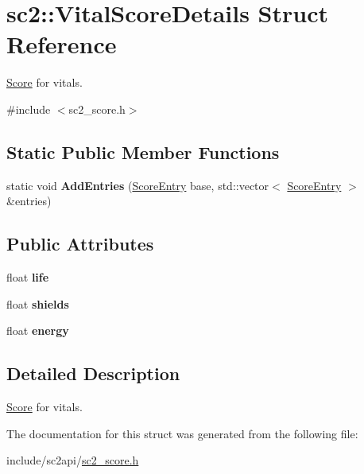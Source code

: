 \hypertarget{structsc2_1_1_vital_score_details}{}\section{sc2\+:\+:Vital\+Score\+Details Struct Reference}
\label{structsc2_1_1_vital_score_details}


\hyperlink{structsc2_1_1_score}{Score} for vitals.  




{\ttfamily \#include $<$sc2\+\_\+score.\+h$>$}

\subsection*{Static Public Member Functions}
\begin{DoxyCompactItemize}
\item 
\mbox{\label{structsc2_1_1_vital_score_details_adfe7fda209f61db978d18a5a70d4b75b}} 
static void {\bfseries Add\+Entries} (\hyperlink{structsc2_1_1_score_entry}{Score\+Entry} base, std\+::vector$<$ \hyperlink{structsc2_1_1_score_entry}{Score\+Entry} $>$ \&entries)
\end{DoxyCompactItemize}
\subsection*{Public Attributes}
\begin{DoxyCompactItemize}
\item 
\mbox{\label{structsc2_1_1_vital_score_details_a9e2038167b6e5297c9f50da7cfd4192c}} 
float {\bfseries life}
\item 
\mbox{\label{structsc2_1_1_vital_score_details_a9473036d04928663c38f6c485b75b619}} 
float {\bfseries shields}
\item 
\mbox{\label{structsc2_1_1_vital_score_details_a896de7149c5e4b19d81700e633140bca}} 
float {\bfseries energy}
\end{DoxyCompactItemize}


\subsection{Detailed Description}
\hyperlink{structsc2_1_1_score}{Score} for vitals. 

The documentation for this struct was generated from the following file\+:\begin{DoxyCompactItemize}
\item 
include/sc2api/\hyperlink{sc2__score_8h}{sc2\+\_\+score.\+h}\end{DoxyCompactItemize}
